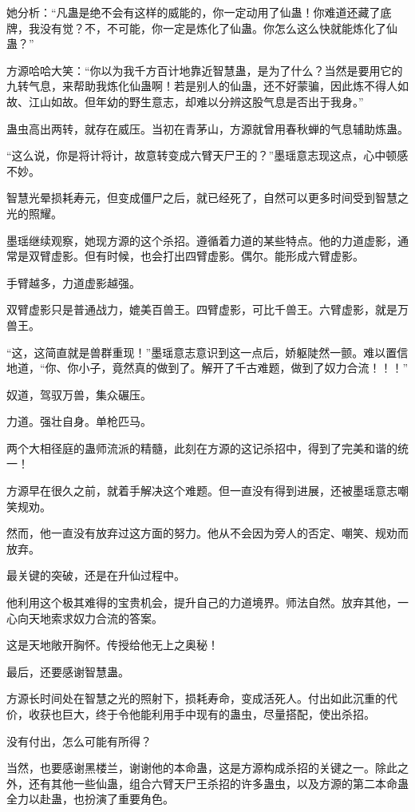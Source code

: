\begin{this_body}
她分析：“凡蛊是绝不会有这样的威能的，你一定动用了仙蛊！你难道还藏了底牌，我没有觉？不，不可能，你一定是炼化了仙蛊。你怎么这么快就能炼化了仙蛊？”

方源哈哈大笑：“你以为我千方百计地靠近智慧蛊，是为了什么？当然是要用它的九转气息，来帮助我炼化仙蛊啊！若是别人的仙蛊，还不好蒙骗，因此炼不得人如故、江山如故。但年幼的野生意志，却难以分辨这股气息是否出于我身。”

蛊虫高出两转，就存在威压。当初在青茅山，方源就曾用春秋蝉的气息辅助炼蛊。

“这么说，你是将计将计，故意转变成六臂天尸王的？”墨瑶意志现这点，心中顿感不妙。

智慧光晕损耗寿元，但变成僵尸之后，就已经死了，自然可以更多时间受到智慧之光的照耀。

墨瑶继续观察，她现方源的这个杀招。遵循着力道的某些特点。他的力道虚影，通常是双臂虚影。但有时候，也会打出四臂虚影。偶尔。能形成六臂虚影。

手臂越多，力道虚影越强。

双臂虚影只是普通战力，媲美百兽王。四臂虚影，可比千兽王。六臂虚影，就是万兽王。

“这，这简直就是兽群重现！”墨瑶意志意识到这一点后，娇躯陡然一颤。难以置信地道，“你、你小子，竟然真的做到了。解开了千古难题，做到了奴力合流！！！”

奴道，驾驭万兽，集众碾压。

力道。强壮自身。单枪匹马。

两个大相径庭的蛊师流派的精髓，此刻在方源的这记杀招中，得到了完美和谐的统一！

方源早在很久之前，就着手解决这个难题。但一直没有得到进展，还被墨瑶意志嘲笑规劝。

然而，他一直没有放弃过这方面的努力。他从不会因为旁人的否定、嘲笑、规劝而放弃。

最关键的突破，还是在升仙过程中。

他利用这个极其难得的宝贵机会，提升自己的力道境界。师法自然。放弃其他，一心向天地索求奴力合流的答案。

这是天地敞开胸怀。传授给他无上之奥秘！

最后，还要感谢智慧蛊。

方源长时间处在智慧之光的照射下，损耗寿命，变成活死人。付出如此沉重的代价，收获也巨大，终于令他能利用手中现有的蛊虫，尽量搭配，使出杀招。

没有付出，怎么可能有所得？

当然，也要感谢黑楼兰，谢谢他的本命蛊，这是方源构成杀招的关键之一。除此之外，还有其他一些仙蛊，组合六臂天尸王杀招的许多蛊虫，以及方源的第二本命蛊全力以赴蛊，也扮演了重要角色。


\end{this_body}
